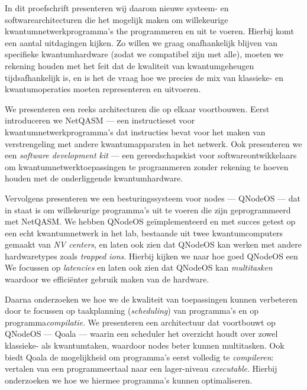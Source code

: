 {In dit proefschrift presenteren wij daarom nieuwe systeem- en softwarearchitecturen die het mogelijk maken om willekeurige kwantumnetwerkprogramma's the programmeren en uit te voeren.
Hierbij komt een aantal uitdagingen kijken.
Zo willen we graag onafhankelijk blijven van specifieke kwantumhardware (zodat we compatibel zijn met alle), moeten we rekening houden met het feit dat de kwaliteit van kwantumgeheugen tijdsafhankelijk is, en is het de vraag hoe we precies de mix van klassieke- en kwantumoperaties moeten representeren en uitvoeren.

We presenteren een reeks architecturen die op elkaar voortbouwen.
Eerst introduceren we NetQASM --- een instructieset voor kwantumnetwerkprogramma's dat instructies bevat voor het maken van verstrengeling met andere kwantumapparaten in het netwerk.
Ook presenteren we een \emph{software development kit} --- een gereedschapskist voor softwareontwikkelaars om kwantumnetwerktoepassingen te programmeren zonder rekening te hoeven houden met de onderliggende kwantumhardware.

Vervolgens presenteren we een besturingssysteem voor nodes --- QNodeOS --- dat in staat is om willekeurige programma's uit te voeren die zijn geprogrammeerd met NetQASM.
We hebben QNodeOS geïmplementeerd en met succes getest op een echt kwantumnetwerk in het lab, bestaande uit twee kwantumcomputers gemaakt van \emph{NV centers}, en laten ook zien dat QNodeOS kan werken met andere hardwaretypes zoals \emph{trapped ions}.
Hierbij kijken we naar hoe goed QNodeOS een 
We focussen op \emph{latencies} en laten ook zien dat QNodeOS kan \emph{multitasken} waardoor we efficiënter gebruik maken van de hardware.

Daarna onderzoeken we hoe we de kwaliteit van toepassingen kunnen verbeteren door te focussen op taakplanning (\emph{scheduling}) van programma's en op programma\emph{compilatie}.
We presenteren een architectuur dat voortbouwt op QNodeOS --- Qoala --- waarin een scheduler het overzicht houdt over zowel klassieke- als kwantumtaken, waardoor nodes beter kunnen multitasken.
Ook biedt Qoala de mogelijkheid om programma's eerst volledig te \emph{compileren}: vertalen van een programmeertaal naar een lager-niveau \emph{executable}.
Hierbij onderzoeken we hoe we hiermee programma's kunnen optimaliseren.




}
